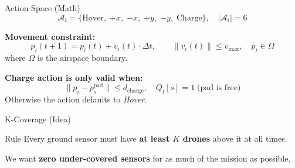 \documentclass[aspectratio=169,12pt]{beamer}
\begin{document}
\begin{frame}{Action Space (Math)}
\[
\mathcal{A}_i = \bigl\{
  \text{Hover},\;
  {+x},\; {-x},\; {+y},\; {-y},\;
  \text{Charge}
\bigr\}, \quad |\mathcal{A}_i| = 6
\]

\vspace{0.4em}
\textbf{Movement constraint:}
\[
p_i(t+1) = p_i(t) + v_i(t) \cdot \Delta t,
\qquad \|v_i(t)\| \le v_{\max}, \quad p_i \in \Omega
\]
where $\Omega$ is the airspace boundary.

\vspace{0.4em}
\textbf{Charge action is only valid when:}
\[
\|p_i - p_s^{\text{pad}}\| \le d_{\text{charge}},
\quad Q_t[s] = 1 \;\text{(pad is free)}
\]
Otherwise the action defaults to \emph{Hover}.
\end{frame}


\begin{frame}{K-Coverage (Idea)}
\begin{block}{Rule}
Every ground sensor must have \textbf{at least $K$ drones} above it at all times.
\end{block}

\vspace{0.3em}
\begin{center}
\end{center}

\vspace{0.3em}
We want \textbf{zero under-covered sensors} for as much of the mission as possible.
\end{frame}
\end{document}
